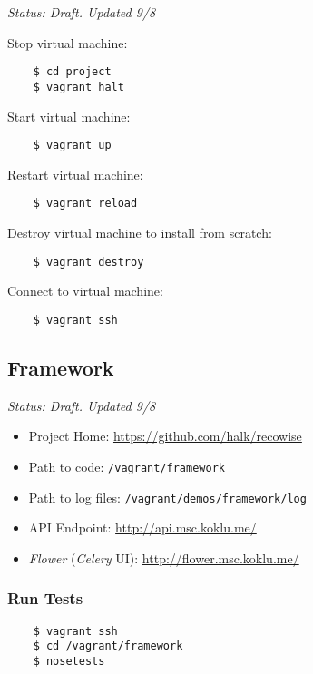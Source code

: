 \emph{Status: Draft. Updated 9/8}

Stop virtual machine:

\begin{verbatim}
    $ cd project
    $ vagrant halt
\end{verbatim}

Start virtual machine:

\begin{verbatim}
    $ vagrant up
\end{verbatim}

Restart virtual machine:

\begin{verbatim}
    $ vagrant reload
\end{verbatim}

Destroy virtual machine to install from scratch:

\begin{verbatim}
    $ vagrant destroy
\end{verbatim}

Connect to virtual machine:

\begin{verbatim}
    $ vagrant ssh
\end{verbatim}


\subsection{Framework}

\emph{Status: Draft. Updated 9/8}

\begin{itemize}
\item Project Home: \url{https://github.com/halk/recowise}
\item Path to code: \texttt{/vagrant/framework}
\item Path to log files: \texttt{/vagrant/demos/framework/log}
\item API Endpoint: \url{http://api.msc.koklu.me/}
\item \emph{Flower} (\emph{Celery} UI): \url{http://flower.msc.koklu.me/}
\end{itemize}

\subsubsection{Run Tests}

\begin{verbatim}
    $ vagrant ssh
    $ cd /vagrant/framework
    $ nosetests
\end{verbatim}

